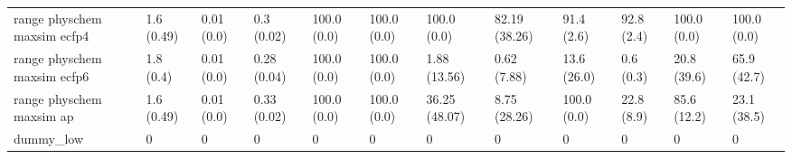 \begin{tabular}{llllllllllll}
range physchem maxsim ecfp4 & {\cellcolor[HTML]{F5FBFC}} \color[HTML]{000000} 1.6 (0.49) & {\cellcolor[HTML]{F7FCFD}} \color[HTML]{000000} 0.01 (0.0) & {\cellcolor[HTML]{3FAB72}} \color[HTML]{F1F1F1} 0.3 (0.02) & {\cellcolor[HTML]{F7FCFD}} \color[HTML]{000000} 100.0 (0.0) & {\cellcolor[HTML]{F7FCFD}} \color[HTML]{000000} 100.0 (0.0) & {\cellcolor[HTML]{00441B}} \color[HTML]{F1F1F1} 100.0 (0.0) & {\cellcolor[HTML]{0E7936}} \color[HTML]{F1F1F1} 82.19 (38.26) & {\cellcolor[HTML]{00441B}} \color[HTML]{F1F1F1} 91.4 (2.6) & {\cellcolor[HTML]{D1EEE9}} \color[HTML]{000000} 92.8 (2.4) & {\cellcolor[HTML]{05712F}} \color[HTML]{F1F1F1} 100.0 (0.0) & {\cellcolor[HTML]{D0EDE9}} \color[HTML]{000000} 100.0 (0.0) \\
range physchem maxsim ecfp6 & {\cellcolor[HTML]{F5FBFC}} \color[HTML]{000000} 1.8 (0.4) & {\cellcolor[HTML]{F6FCFD}} \color[HTML]{000000} 0.01 (0.0) & {\cellcolor[HTML]{63C0A0}} \color[HTML]{000000} 0.28 (0.04) & {\cellcolor[HTML]{00441B}} \color[HTML]{F1F1F1} 100.0 (0.0) & {\cellcolor[HTML]{00441B}} \color[HTML]{F1F1F1} 100.0 (0.0) & {\cellcolor[HTML]{F5FBFC}} \color[HTML]{000000} 1.88 (13.56) & {\cellcolor[HTML]{F6FCFD}} \color[HTML]{000000} 0.62 (7.88) & {\cellcolor[HTML]{00441B}} \color[HTML]{F1F1F1} 13.6 (26.0) & {\cellcolor[HTML]{70C6AC}} \color[HTML]{000000} 0.6 (0.3) & {\cellcolor[HTML]{005020}} \color[HTML]{F1F1F1} 20.8 (39.6) & {\cellcolor[HTML]{EDF8FB}} \color[HTML]{000000} 65.9 (42.7) \\
range physchem maxsim ap & {\cellcolor[HTML]{F5FBFC}} \color[HTML]{000000} 1.6 (0.49) & {\cellcolor[HTML]{F6FCFD}} \color[HTML]{000000} 0.01 (0.0) & {\cellcolor[HTML]{3DA96F}} \color[HTML]{F1F1F1} 0.33 (0.02) & {\cellcolor[HTML]{00441B}} \color[HTML]{F1F1F1} 100.0 (0.0) & {\cellcolor[HTML]{00441B}} \color[HTML]{F1F1F1} 100.0 (0.0) & {\cellcolor[HTML]{9FDACC}} \color[HTML]{000000} 36.25 (48.07) & {\cellcolor[HTML]{EBF7FA}} \color[HTML]{000000} 8.75 (28.26) & {\cellcolor[HTML]{00441B}} \color[HTML]{F1F1F1} 100.0 (0.0) & {\cellcolor[HTML]{BAE5DC}} \color[HTML]{000000} 22.8 (8.9) & {\cellcolor[HTML]{006227}} \color[HTML]{F1F1F1} 85.6 (12.2) & {\cellcolor[HTML]{EEF8FB}} \color[HTML]{000000} 23.1 (38.5) \\
dummy_low & {\cellcolor[HTML]{F7FCFD}} \color[HTML]{000000} 0 & {\cellcolor[HTML]{F7FCFD}} \color[HTML]{000000} 0 & {\cellcolor[HTML]{F7FCFD}} \color[HTML]{000000} 0 & {\cellcolor[HTML]{F7FCFD}} \color[HTML]{000000} 0 & {\cellcolor[HTML]{F7FCFD}} \color[HTML]{000000} 0 & {\cellcolor[HTML]{F7FCFD}} \color[HTML]{000000} 0 & {\cellcolor[HTML]{F7FCFD}} \color[HTML]{000000} 0 & {\cellcolor[HTML]{F7FCFD}} \color[HTML]{000000} 0 & {\cellcolor[HTML]{F7FCFD}} \color[HTML]{000000} 0 & {\cellcolor[HTML]{F7FCFD}} \color[HTML]{000000} 0 & {\cellcolor[HTML]{F7FCFD}} \color[HTML]{000000} 0 \\

\end{tabular}

